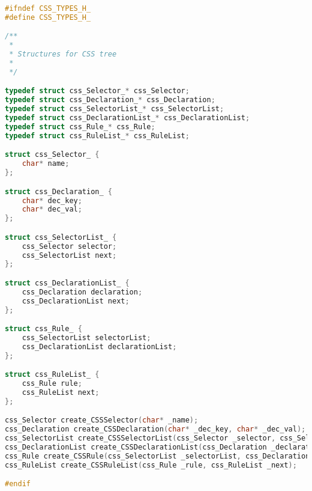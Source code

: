 \begin{lstlisting}[label=css_structs,language=C, caption=C Struckturen für die Baumgenerierung]
#ifndef CSS_TYPES_H_
#define CSS_TYPES_H_

/**
 *
 * Structures for CSS tree
 *
 */

typedef struct css_Selector_* css_Selector;
typedef struct css_Declaration_* css_Declaration;
typedef struct css_SelectorList_* css_SelectorList;
typedef struct css_DeclarationList_* css_DeclarationList;
typedef struct css_Rule_* css_Rule;
typedef struct css_RuleList_* css_RuleList;

struct css_Selector_ {
	char* name;
};

struct css_Declaration_ {
	char* dec_key;
	char* dec_val;
};

struct css_SelectorList_ {
	css_Selector selector;
	css_SelectorList next;
};

struct css_DeclarationList_ {
	css_Declaration declaration;
	css_DeclarationList next;
};

struct css_Rule_ {
	css_SelectorList selectorList;
	css_DeclarationList declarationList;	
};

struct css_RuleList_ {
	css_Rule rule;
	css_RuleList next;
};

css_Selector create_CSSSelector(char* _name);
css_Declaration create_CSSDeclaration(char* _dec_key, char* _dec_val);
css_SelectorList create_CSSSelectorList(css_Selector _selector, css_SelectorList _next);
css_DeclarationList create_CSSDeclarationList(css_Declaration _declaration, css_DeclarationList _next);
css_Rule create_CSSRule(css_SelectorList _selectorList, css_DeclarationList _declarationList);
css_RuleList create_CSSRuleList(css_Rule _rule, css_RuleList _next);

#endif
\end{lstlisting}
